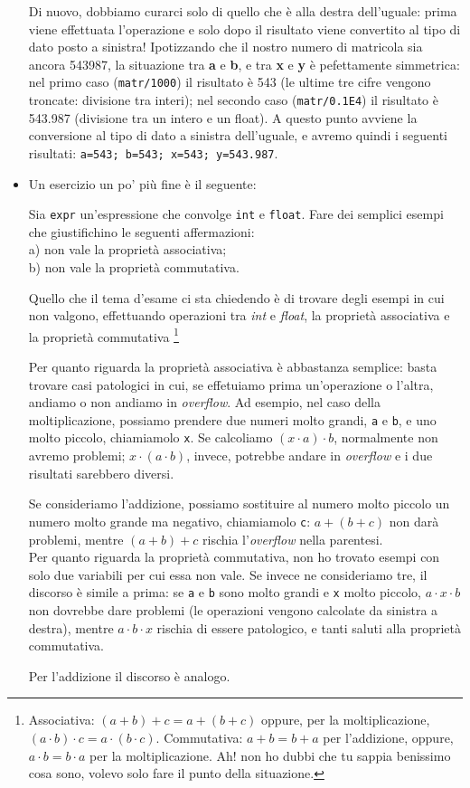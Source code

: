 \begin{itemize}
Di nuovo, dobbiamo curarci solo di quello che è alla destra dell'uguale: prima viene effettuata l'operazione e solo dopo il risultato viene convertito al tipo di dato posto a sinistra! Ipotizzando che il nostro numero di matricola sia ancora 543987, la situazione tra \textbf{a} e \textbf{b}, e tra \textbf{x} e \textbf{y} è pefettamente simmetrica: nel primo caso (\verb|matr/1000|) il risultato è 543 (le ultime tre cifre vengono troncate: divisione tra interi); nel secondo caso (\verb|matr/0.1E4|) il risultato è 543.987 (divisione tra un intero e un float). A questo punto avviene la conversione al tipo di dato a sinistra dell'uguale, e avremo quindi i seguenti risultati: \verb|a=543; b=543; x=543; y=543.987|.
\item Un esercizio un po' più fine è il seguente:
\begin{shaded}
Sia \verb|expr| un'espressione che convolge \verb|int| e \verb|float|. Fare dei semplici esempi che giustifichino le seguenti affermazioni:\\
a) non vale la proprietà associativa;\\
b) non vale la proprietà commutativa.
\end{shaded}

	Quello che il tema d'esame ci sta chiedendo è di trovare degli esempi in cui non valgono, effettuando operazioni tra \emph{int} e \emph{float}, la proprietà associativa  e la proprietà commutativa \footnote{Associativa: $(a+b)+c=a+(b+c)$ oppure, per la moltiplicazione, $(a\cdot b)\cdot c=a\cdot(b\cdot c)$. Commutativa: $a+b=b+a$ per l'addizione, oppure, $a\cdot b=b\cdot a$ per la moltiplicazione. Ah! non ho dubbi che tu sappia benissimo cosa sono, volevo solo fare il punto della situazione.}
	
	Per quanto riguarda la proprietà associativa è abbastanza semplice: basta trovare casi patologici in cui, se effetuiamo prima un'operazione o l'altra, andiamo o non andiamo in \emph{overflow}. Ad esempio, nel caso della moltiplicazione, possiamo prendere due numeri molto grandi, \verb|a| e \verb|b|, e uno molto piccolo, chiamiamolo \verb|x|. Se calcoliamo $(x\cdot a)\cdot b$, normalmente non avremo problemi; $x\cdot (a\cdot b)$, invece, potrebbe andare in \emph{overflow} e i due risultati sarebbero diversi. 
	
	Se consideriamo l'addizione, possiamo sostituire al numero molto piccolo un numero molto grande ma negativo, chiamiamolo \verb|c|: $a+(b+c)$ non darà problemi, mentre $(a+b)+c$ rischia l'\emph{overflow} nella parentesi. \\
	
	Per quanto riguarda la proprietà commutativa, non ho trovato esempi con solo due variabili per cui essa non vale. Se invece ne consideriamo tre, il discorso è simile a prima: se \verb|a| e \verb|b| sono molto grandi e \verb|x| molto piccolo, $a\cdot x\cdot b$  non dovrebbe dare problemi (le operazioni vengono calcolate da sinistra a destra), mentre  $a\cdot b\cdot x$ rischia di essere patologico, e tanti saluti alla proprietà commutativa.
	
	Per l'addizione il discorso è analogo. 
\end{itemize}

